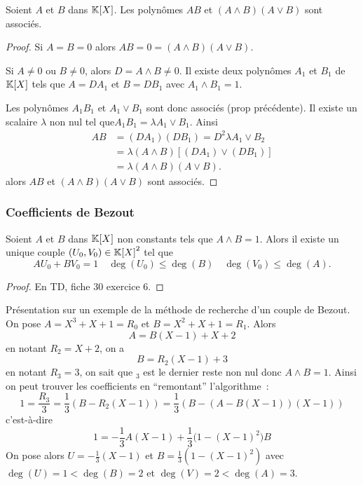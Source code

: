 \begin{prop}
  Soient \(A\) et \(B\) dans \(\mathbb{K}[X]\). Les polynômes \(AB\) et \((A\wedge B)(A
  \vee B)\) sont associés.
\end{prop}
\begin{proof}
  Si \(A = B=0\) alors \(AB = 0=(A\wedge B)(A \vee B)\).

  Si \(A\neq 0\) ou \(B\neq 0\), alors \(D = A \wedge B \neq 0\). Il existe deux
  polynômes \(A_1\) et \(B_1\) de \(\mathbb{K}[X]\) tels que \(A = DA_1\) et \(B = DB_1\)
  avec \(A_1 \wedge B_1 =1\).

  Les polynômes \(A_1B_1\) et \(A_1 \vee B_1\) sont donc associés (prop
  précédente). Il existe un scalaire \(\lambda\) non nul tel que\( A_1B_1=
  \lambda A_1 \vee B_1\). Ainsi
  \begin{align}
    AB& = (DA_1)(DB_1) = D^2 \lambda A_1 \vee B_2 \\
    & = \lambda (A \wedge B) [(DA_1) \vee (DB_1)]\\
    & = \lambda (A \wedge B)(A \vee B).
  \end{align}
  alors \(AB\) et \((A\wedge B)(A \vee B)\) sont associés.
\end{proof}

\subsubsection{Coefficients de Bezout}

\begin{prop}
  Soient \(A\) et \(B\) dans \(\mathbb{K}[X]\) non constants tels que \(A\wedge B = 1\).
  Alors il existe un unique couple \((U_0,V_0) \in {\mathbb{K}[X]}^2\) tel que
  \begin{equation}
    AU_0+BV_0 = 1 \quad \deg(U_0) \leqslant \deg(B) \quad \deg(V_0) \leqslant
    \deg(A).
  \end{equation}
\end{prop}
\begin{proof}
  En TD, fiche 30 exercice 6.
\end{proof}

Présentation sur un exemple de la méthode de recherche d'un couple de Bezout. On
pose \(A = X^3+X+1 = R_0\) et \(B = X^2+X+1 = R_1\). Alors
\begin{equation}
  A = B(X-1)+X+2
\end{equation}
en notant \(R_2 = X+2\), on a
\begin{equation}
  B = R_2(X-1)+3
\end{equation}
en notant \(R_3 = 3\), on sait que \(_3\) est le dernier reste non nul donc
\(A\wedge B = 1\). Ainsi on peut trouver les coefficients en ``remontant''
l'algorithme~:
\begin{equation}
  1 = \frac{R_3}{3} = \frac{1}{3}(B-R_2(X-1)) = \frac{1}{3}(B-(A-B(X-1))(X-1))
\end{equation}
c'est-à-dire
\begin{equation}
  1 = -\frac{1}{3} A(X-1) + \frac{1}{3}{(1-(X-1)}^2)B
\end{equation}
On pose alors \(U = -\frac{1}{3}(X-1)\) et \(B = \frac{1}{3}(1-(X-1)^2)\) avec
\(\deg(U) = 1 < \deg(B) = 2\) et \(\deg(V) = 2 < \deg(A) = 3\).

